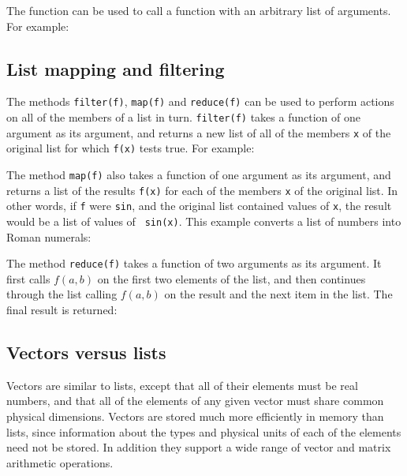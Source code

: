 The  function can be used to call a function with an
arbitrary list of arguments. For example:

\vspace{3mm}

\vspace{3mm}

\subsection{List mapping and filtering}
\label{sec:listfilter}

The methods {\tt filter(f)}, {\tt map(f)} and {\tt reduce(f)} can be used to
perform actions on all of the members of a list in turn. {\tt filter(f)} takes
a function of one argument as its argument, and returns a new list of all of
the members {\tt x} of the original list for which {\tt f(x)} tests true. For
example:

\vspace{3mm}

\vspace{3mm}

The method {\tt map(f)} also takes a function of one argument as its argument,
and returns a list of the results {\tt f(x)} for each of the members {\tt x} of
the original list. In other words, if {\tt f} were {\tt sin}, and the original
list contained values of {\tt x}, the result would be a list of values of {\tt
sin(x)}. This example converts a list of numbers into Roman numerals:

\vspace{3mm}

\vspace{3mm}

The method {\tt reduce(f)} takes a function of two arguments as its argument. It
first calls $f(a,b)$ on the first two elements of the list, and then continues
through the list calling $f(a,b)$ on the result and the next item in the list.
The final result is returned:

\vspace{3mm}

\vspace{3mm}


\subsection{Vectors versus lists}

Vectors are similar to lists, except that all of their elements must be real
numbers, and that all of the elements of any given vector must share common
physical dimensions.  Vectors are stored much more efficiently in memory than
lists, since information about the types and physical units of each of the
elements need not be stored. In addition they support a wide range of vector
and matrix arithmetic operations.

